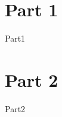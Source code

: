 \documentclass[12pt,a4paper]{article}
\begin{document}
\section*{Part 1}
	{Part1}
\section*{Part 2}
	{Part2}
	
	
\end{document}

